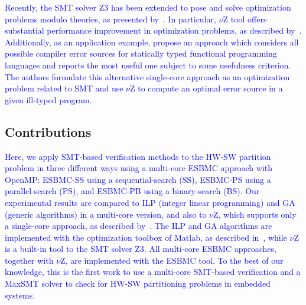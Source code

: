 \documentclass{doublecol-new}
\theoremstyle{TH}{
\newtheorem{lemma}{Lemma}
\newtheorem{theorem}[lemma]{Theorem}
\newtheorem{corrolary}[lemma]{Corrolary}
\newtheorem{conjecture}[lemma]{Conjecture}
\newtheorem{proposition}[lemma]{Proposition}
\newtheorem{claim}[lemma]{Claim}
\newtheorem{stheorem}[lemma]{Wrong Theorem}
\newtheorem{algorithm}{Algorithm}
}
\theoremstyle{THrm}{
\newtheorem{definition}{Definition}[section]
\newtheorem{question}{Question}[section]
\newtheorem{remark}{Remark}
\newtheorem{scheme}{Scheme}
}
\theoremstyle{THhit}{
\newtheorem{case}{Case}[section]
}
\begin{document}
\textcolor{blue}{Recently, the SMT solver Z3 has been extended to pose and solve optimization problems modulo theories, as presented by~\cite{Bjorner2015}. In particular, $\nu$Z tool offers substantial performance improvement in optimization problems, as described by~\cite{Bjorner2014}. Additionally, as an application example, \cite{Pavlinovic2015} propose an approach which considers all possible compiler error sources for statically typed functional programming languages and reports the most useful one subject to some usefulness criterion. The authors formulate this alternative single-core approach as an optimization problem related to SMT and use $\nu$Z to compute an optimal error source in a given ill-typed program.}

\subsection{Contributions}

\textcolor{blue}{Here, we apply SMT-based verification methods to the HW-SW partition problem in three different ways using a multi-core ESBMC approach with OpenMP: ESBMC-SS using a sequential-search (SS), ESBMC-PS using a parallel-search (PS), and ESBMC-PB using a binary-search (BS). Our experimental results are compared to ILP (integer linear programming) and GA (generic algorithms) in a multi-core version, and also to $\nu$Z, which supports only a single-core approach, as described by~\cite{Bjorner2015}. The ILP and GA algorithms are implemented with the optimization toolbox of Matlab, as described in~\cite{TheMathWorks2013}, while $\nu$Z is a built-in tool to the SMT solver Z3. All multi-core ESBMC approaches, together with $\nu$Z, are implemented with the ESBMC tool. To the best of our knowledge, this is the first work to use a multi-core SMT-based verification and a MaxSMT solver to check for HW-SW partitioning problems in embedded systems.}


\end{document}
